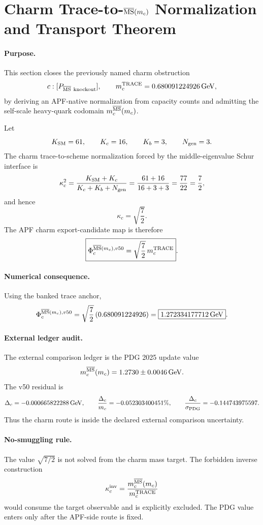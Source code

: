 
\section{Charm Trace-to-\texorpdfstring{$\overline{\rm MS}(m_c)$}{MSbar(mc)} Normalization and Transport Theorem}
\label{sec:charm-trace-msbar-v50}

\paragraph{Purpose.}
This section closes the previously named charm obstruction
\[
 c:[P_{\overline{\rm MS}\ {\rm knockout}}],
 \qquad
 m_c^{\rm TRACE}=0.680091224926\,\mathrm{GeV},
\]
by deriving an APF-native normalization from capacity counts and admitting the
self-scale heavy-quark codomain $m_c^{\overline{\rm MS}}(m_c)$.

\begin{theorem}
Let
\[
K_{\rm SM}=61,\qquad K_c=16,\qquad K_b=3,\qquad N_{\rm gen}=3.
\]
The charm trace-to-scheme normalization forced by the middle-eigenvalue
Schur interface is
\[
\kappa_c^2
=\frac{K_{\rm SM}+K_c}{K_c+K_b+N_{\rm gen}}
=\frac{61+16}{16+3+3}
=\frac{77}{22}
=\frac72,
\]
and hence
\[
\boxed{\kappa_c=\sqrt{\frac72}}.
\]
The APF charm export-candidate map is therefore
\[
\boxed{
\Phi_c^{\overline{\rm MS}(m_c),v50}
=\sqrt{\frac72}\,m_c^{\rm TRACE}
}.
\]
\end{theorem}

\paragraph{Numerical consequence.}
Using the banked trace anchor,
\[
\Phi_c^{\overline{\rm MS}(m_c),v50}
=\sqrt{\frac72}\,(0.680091224926)
=\boxed{1.272334177712\,\mathrm{GeV}}.
\]

\paragraph{External ledger audit.}
The external comparison ledger is the PDG 2025 update value
\[
 m_c^{\overline{\rm MS}}(m_c)=1.2730\pm0.0046\,\mathrm{GeV}.
\]
The v50 residual is
\[
\Delta_c=-0.000665822288\,\mathrm{GeV},
\qquad
\frac{\Delta_c}{m_c}=-0.052303400451\%,
\qquad
\frac{\Delta_c}{\sigma_{\rm PDG}}=-0.144743975597.
\]
Thus the charm route is inside the declared external comparison uncertainty.

\paragraph{No-smuggling rule.}
The value $\sqrt{7/2}$ is not solved from the charm mass target.  The
forbidden inverse construction
\[
\kappa_c^{\rm inv}
=\frac{m_c^{\overline{\rm MS}}(m_c)}{m_c^{\rm TRACE}}
\]
would consume the target observable and is explicitly excluded.  The PDG value
enters only after the APF-side route is fixed.

